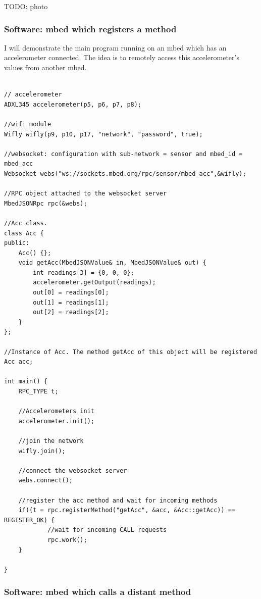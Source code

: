 \documentclass[pdftex,10pt,a4paper]{report}
\begin{document}
TODO: photo

\subsubsection{Software: mbed which registers a method}
I will demonstrate the main program running on an mbed which has an accelerometer connected. The idea is to remotely access this accelerometer's values from another mbed.


\begin{lstlisting}[label=Client which registers a method,caption=Client which registers a method]

// accelerometer
ADXL345 accelerometer(p5, p6, p7, p8);

//wifi module
Wifly wifly(p9, p10, p17, "network", "password", true);

//websocket: configuration with sub-network = sensor and mbed_id = mbed_acc 
Websocket webs("ws://sockets.mbed.org/rpc/sensor/mbed_acc",&wifly);

//RPC object attached to the websocket server
MbedJSONRpc rpc(&webs);

//Acc class. 
class Acc {
public:
    Acc() {};
    void getAcc(MbedJSONValue& in, MbedJSONValue& out) {
        int readings[3] = {0, 0, 0};
        accelerometer.getOutput(readings);
        out[0] = readings[0];
        out[1] = readings[1];
        out[2] = readings[2];
    }
};

//Instance of Acc. The method getAcc of this object will be registered
Acc acc;

int main() {
    RPC_TYPE t;
    
    //Accelerometers init
    accelerometer.init();
    
    //join the network
    wifly.join();
    
    //connect the websocket server
    webs.connect();

    //register the acc method and wait for incoming methods
    if((t = rpc.registerMethod("getAcc", &acc, &Acc::getAcc)) == REGISTER_OK) {
    		//wait for incoming CALL requests
    		rpc.work(); 
    }
    
}
\end{lstlisting}

\subsubsection{Software: mbed which calls a distant method}
\end{document}
